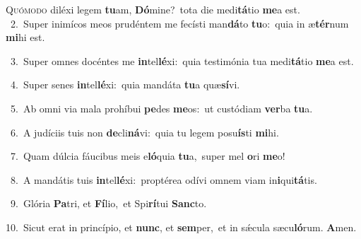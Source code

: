 \lettrine{\initial\textcolor{\initialcolor}{Q}}{uómodo} diléxi legem \textbf{tu}\-am, \textbf{Dó}\-mine?~\star tota die medi\-\textbf{tá}\-tio \textbf{me}\-a est.\\
{\numbfont\textcolor{\numbcolor}{~2.}}~Super inimícos meos prudéntem me fecísti man\-\textbf{dá}\-to \textbf{tu}\-o:~\star quia in æ\-\textbf{tér}\-num \textbf{mi}\-hi est.\par
{\numbfont\textcolor{\numbcolor}{~3.}}~Super omnes docéntes me \textbf{in}\-tel\-\textbf{lé}\-xi:~\star quia testimónia tua medi\-\textbf{tá}\-tio \textbf{me}\-a est.\par
{\numbfont\textcolor{\numbcolor}{~4.}}~Super senes \textbf{in}\-tel\-\textbf{lé}\-xi:~\star quia mandáta \textbf{tu}\-a quæ\-\textbf{sí}\-vi.\par
{\numbfont\textcolor{\numbcolor}{~5.}}~Ab omni via mala prohíbui \textbf{pe}\-des \textbf{me}\-os:~\star ut custódiam \textbf{ver}\-ba \textbf{tu}\-a.\par
{\numbfont\textcolor{\numbcolor}{~6.}}~A judíciis tuis non \textbf{de}\-cli\-\textbf{ná}\-vi:~\star quia tu legem posu\-\textbf{ís}\-ti \textbf{mi}\-hi.\par
{\numbfont\textcolor{\numbcolor}{~7.}}~Quam dúlcia fáucibus meis e\-\textbf{ló}\-quia \textbf{tu}\-a,~\star super mel \textbf{o}\-ri \textbf{me}\-o!\par
{\numbfont\textcolor{\numbcolor}{~8.}}~A mandátis tuis \textbf{in}\-tel\-\textbf{lé}\-xi:~\star proptérea odívi omnem viam in\-\textbf{i}\-qui\-\textbf{tá}\-tis.\par
{\numbfont\textcolor{\numbcolor}{~9.}}~Glória \textbf{Pa}\-tri, et \textbf{Fí}\-lio,~\star et Spi\-\textbf{rí}\-tui \textbf{Sanc}\-to.\par
{\numbfont\textcolor{\numbcolor}{10.}}~Sicut erat in princípio, et \textbf{nunc}\-, et \textbf{sem}\-per,~\star et in sǽcula sæcu\-\textbf{ló}\-rum. \textbf{A}\-men.\par
